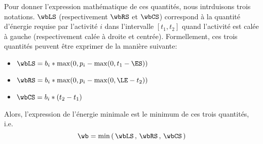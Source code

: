 Pour donner l'expression mathématique de ces quantités, nous
intrduisons trois notations. $\wbLS$ (respectivement $\wbRS$ et
$\wbCS$) correspond à la quantité d'énergie requise par l'activité $i$
dans l'intervalle $[t_1,t_2]$ quand l'activité est calée à gauche
(respectivement calée à droite et centrée). Formellement, ces trois
quantités peuvent être exprimer de la manière suivante: 
\begin{itemize}
\item $\wbLS=b_i * \max(0,p_i- \max(0,t_1 - \ES))$
\item $\wbRS=b_i * \max(0,p_i- \max(0, \LE-t_2))$
\item $\wbCS=b_i * (t_2-t_1)$
\end{itemize}
Alors, l'expression de l'énergie minimale est le minimum de ces trois
quantités, i.e.
\begin{equation}
\wb=\min\left(\, \wbLS\, ,\,\wbRS\, ,\,\wbCS \, \right)
\end{equation} 


